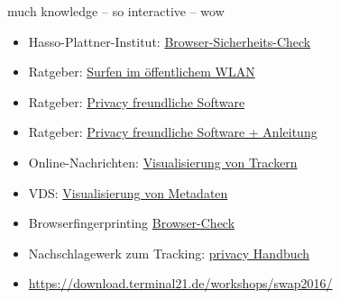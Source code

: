 \documentclass[hyperref={colorlinks,linkcolor=white}, utf8]{beamer}
\begin{document}
	\begin{frame}{much knowledge -- so interactive -- wow}
		\noindent
		\begin{itemize}
			\item Hasso-Plattner-Institut: \href{https://sec.hpi.de/vulndb/sd_first/}{Browser-Sicherheits-Check}
			\item Ratgeber: 
			\href{https://www.mbem.nrw/unterwegs-im-oeffentlichen-wlan-aber-gut-geschuetzt}{Surfen im öffentlichem WLAN }
			\item Ratgeber: \href{https://prism-break.org/en/}{Privacy freundliche Software}
			\item Ratgeber: \href{(https://ssd.eff.org/)}{Privacy freundliche Software + Anleitung}
			\item Online-Nachrichten: \href{https://trackography.org/}{Visualisierung von Trackern}
			\item VDS: \href{http://www.zeit.de/datenschutz/malte-spitz-vorratsdaten }{Visualisierung von Metadaten}				
			\item Browserfingerprinting \href{https://panopticlick.eff.org}{Browser-Check}
			\item Nachschlagewerk zum Tracking: \href{https://privacy-handbuch.de/}{privacy Handbuch}
			\item \url{https://download.terminal21.de/workshops/swap2016/}
		\end{itemize}
	\end{frame}
	
	
	
\end{document}
